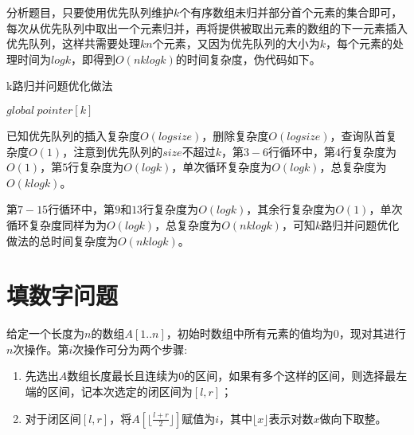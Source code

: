 \documentclass{article}
\begin{document}
分析题目，只要使用优先队列维护$k$个有序数组未归并部分首个元素的集合即可，每次从优先队列中取出一个元素归并，再将提供被取出元素的数组的下一元素插入优先队列，这样共需要处理$k n$个元素，又因为优先队列的大小为$k$，每个元素的处理时间为$log k$，即得到$O(n k log k)$的时间复杂度，伪代码如下。

\begin{algorithm}[H]

\caption{k路归并问题优化做法}
\LinesNumbered
{}

$global\ pointer[k]$


\end{algorithm}

已知优先队列的插入复杂度$O(log size)$，删除复杂度$O(log size)$，查询队首复杂度$O(1)$，注意到优先队列的$size$不超过$k$，第$3-6$行循环中，第$4$行复杂度为$O(1)$，第$5$行复杂度为$O(log k)$，单次循环复杂度为$O(log k)$，总复杂度为$O(k log k)$。

第$7-15$行循环中，第$9$和$13$行复杂度为$O(log k)$，其余行复杂度为$O(1)$，单次循环复杂度同样为为$O(log k)$，总复杂度为$O(n k log k)$，可知$k$路归并问题优化做法的总时间复杂度为$O(n k log k)$。

\section{填数字问题}

给定一个长度为$n$的数组$A[1..n]$，初始时数组中所有元素的值均为$0$，现对其进行$n$次操作。第$i$次操作可分为两个步骤:

\begin{enumerate}
    \item 先选出$A$数组长度最长且连续为$0$的区间，如果有多个这样的区间，则选择最左端的区间，记本次选定的闭区间为$[l,r]$；
    \item 对于闭区间$[l,r]$，将$A[\lfloor\frac{l+r}{2}\rfloor]$赋值为$i$，其中$\lfloor{x}\rfloor$表示对数$x$做向下取整。
\end{enumerate}
\end{document}
